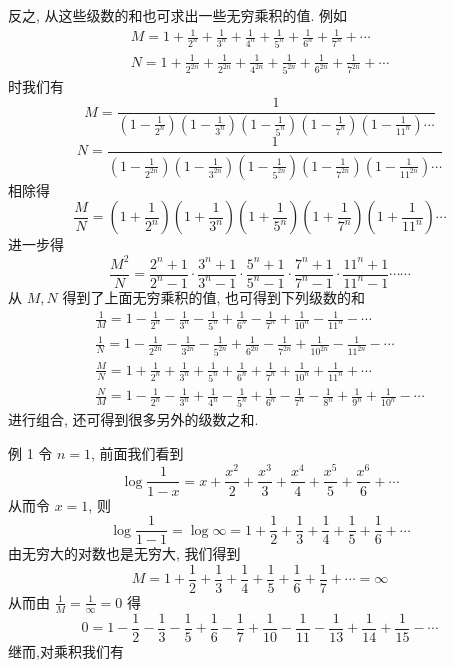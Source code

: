 反之, 从这些级数的和也可求出一些无穷乘积的值. 例如
\[
\begin{gathered}
M=1+\frac{1}{2^{n}}+\frac{1}{3^{n}}+\frac{1}{4^{n}}+\frac{1}{5^{n}}+\frac{1}{6^{n}}+\frac{1}{7^{n}}+\cdots \\
N=1+\frac{1}{2^{2 n}}+\frac{1}{2^{2 n}}+\frac{1}{4^{2 n}}+\frac{1}{5^{2 n}}+\frac{1}{6^{2 n}}+\frac{1}{7^{2 n}}+\cdots
\end{gathered}
\]
时我们有
\[
M=\frac{1}{\left(1-\frac{1}{2^{n}}\right)\left(1-\frac{1}{3^{n}}\right)\left(1-\frac{1}{5^{n}}\right)\left(1-\frac{1}{7^{n}}\right)\left(1-\frac{1}{11^{n}}\right) \cdots}
\]
\[
 N=\frac{1}{\left(1-\frac{1}{2^{2 n}}\right)\left(1-\frac{1}{3^{2 n}}\right)\left(1-\frac{1}{5^{2 n}}\right)\left(1-\frac{1}{7^{2 n}}\right)\left(1-\frac{1}{11^{2 n}}\right) \cdots}
\]
相除得
\[
\frac{M}{N}=\left(1+\frac{1}{2^{n}}\right)\left(1+\frac{1}{3^{n}}\right)\left(1+\frac{1}{5^{n}}\right)\left(1+\frac{1}{7^{n}}\right)\left(1+\frac{1}{11^{n}}\right) \cdots
\]
进一步得
\[
\frac{M^{2}}{N}=\frac{2^{n}+1}{2^{n}-1} \cdot \frac{3^{n}+1}{3^{n}-1} \cdot \frac{5^{n}+1}{5^{n}-1} \cdot \frac{7^{n}+1}{7^{n}-1} \cdot \frac{11^{n}+1}{11^{n}-1} \cdots \cdots
\]
从 $M, N$ 得到了上面无穷乘积的值, 也可得到下列级数的和
\[
\begin{gathered}
\frac{1}{M}=1-\frac{1}{2^{n}}-\frac{1}{3^{n}}-\frac{1}{5^{n}}+\frac{1}{6^{n}}-\frac{1}{7^{n}}+\frac{1}{10^{n}}-\frac{1}{11^{n}}-\cdots \\
\frac{1}{N}=1-\frac{1}{2^{2 n}}-\frac{1}{3^{2 n}}-\frac{1}{5^{2 n}}+\frac{1}{6^{2 n}}-\frac{1}{7^{2 n}}+\frac{1}{10^{2 n}}-\frac{1}{11^{2 n}}-\cdots \\
\frac{M}{N}=1+\frac{1}{2^{n}}+\frac{1}{3^{n}}+\frac{1}{5^{n}}+\frac{1}{6^{n}}+\frac{1}{7^{n}}+\frac{1}{10^{n}}+\frac{1}{11^{n}}+\cdots \\
\frac{N}{M}=1-\frac{1}{2^{n}}-\frac{1}{3^{n}}+\frac{1}{4^{n}}-\frac{1}{5^{n}}+\frac{1}{6^{n}}-\frac{1}{7^{n}}-\frac{1}{8^{n}}+\frac{1}{9^{n}}+\frac{1}{10^{n}}-\cdots
\end{gathered}
\]
进行组合, 还可得到很多另外的级数之和.

例 1 令 $n=1$, 前面我们看到
\[
\log \frac{1}{1-x}=x+\frac{x^{2}}{2}+\frac{x^{3}}{3}+\frac{x^{4}}{4}+\frac{x^{5}}{5}+\frac{x^{6}}{6}+\cdots
\]
从而令 $x=1$, 则
\[
\log \frac{1}{1-1}=\log \infty=1+\frac{1}{2}+\frac{1}{3}+\frac{1}{4}+\frac{1}{5}+\frac{1}{6}+\cdots
\]
由无穷大的对数也是无穷大, 我们得到
\[
M=1+\frac{1}{2}+\frac{1}{3}+\frac{1}{4}+\frac{1}{5}+\frac{1}{6}+\frac{1}{7}+\cdots=\infty
\]
从而由 $\frac{1}{M}=\frac{1}{\infty}=0$ 得
\[
0=1-\frac{1}{2}-\frac{1}{3}-\frac{1}{5}+\frac{1}{6}-\frac{1}{7}+\frac{1}{10}-\frac{1}{11}-\frac{1}{13}+\frac{1}{14}+\frac{1}{15}-\cdots
\]
继而,对乘积我们有

